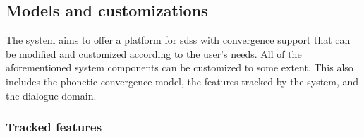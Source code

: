 %

\subsection{Models and customizations}
\label{subsec:models_and_cusomizations}

The system aims to offer a platform for \acp{sds} with convergence support that can be modified and customized according to the user's needs.
All of the aforementioned system components can be customized to some extent.
This also includes the phonetic convergence model, the features tracked by the system, and the dialogue domain.

\subsubsection{Tracked features}
\label{subsubsec:tracked_features}



